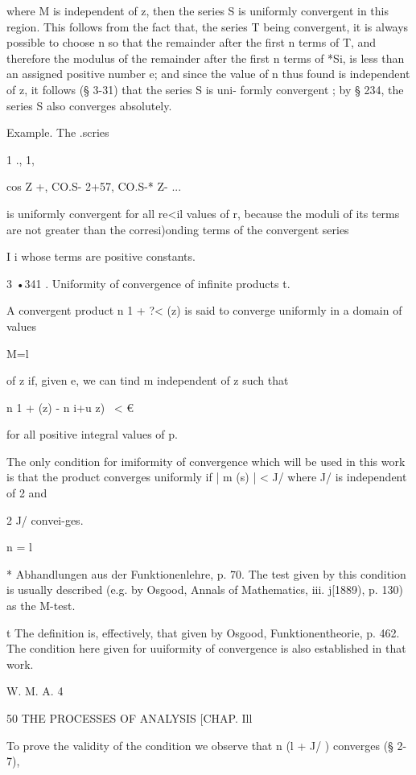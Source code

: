 where M is independent of z, then the series S is uniformly convergent
in this region. This follows from the fact that, the series T being
convergent, it is always possible to choose n so that the remainder
after the first n terms of T, and therefore the modulus of the
remainder after the first n terms of *Si, is less than an assigned
positive number e; and since the value of n thus found is independent
of z, it follows (§ 3-31) that the series S is uni- formly convergent
; by § 234, the series S also converges absolutely.

Example. The .scries

1 ., 1,

cos Z +, CO.S- 2+57, CO.S-* Z- ...

is uniformly convergent for all re<il values of r, because the moduli
of its terms are not greater than the corresi)onding terms of the
convergent series

I i whose terms are positive constants.

3 •341 . Uniformity of convergence of infinite products t.

A convergent product n 1 + ?< (z) is said to converge uniformly in a
domain of values

M=l

of z if, given e, we can tind m independent of z such that

n 1 + (z) - n i+u z) \ < €

for all positive integral values of p.

The only condition for imiformity of convergence which will be used in
this work is that the product converges uniformly if | m (s) | < J/
where J/ is independent of 2 and

2 J/ convei-ges.

n = l

* Abhandlungen aus der Funktionenlehre, p. 70. The test given by this
condition is usually described (e.g. by Osgood, Annals of Mathematics,
iii. j[1889), p. 130) as the M-test.

t The definition is, effectively, that given by Osgood,
Funktionentheorie, p. 462. The condition here given for uuiformity of
convergence is also established in that work.

W. M. A. 4



50 THE PROCESSES OF ANALYSIS [CHAP. Ill

To prove the validity of the condition we observe that n (l + J/ )
converges (§ 2-7),

